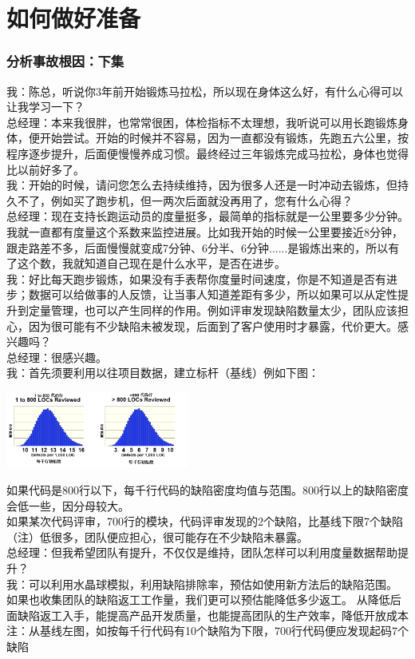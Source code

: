 \chapter{如何做好准备} %

\hypertarget{ux5206ux6790ux4e8bux6545ux6839ux56e0ux4e0bux96c6}{%
\subsection{分析事故根因：下集}\label{ux5206ux6790ux4e8bux6545ux6839ux56e0ux4e0bux96c6}}

我：陈总，听说你3年前开始锻炼马拉松，所以现在身体这么好，有什么心得可以让我学习一下？\\
总经理：本来我很胖，也常常很困，体检指标不太理想，我听说可以用长跑锻炼身体，便开始尝试。开始的时候并不容易，因为一直都没有锻炼，先跑五六公里，按程序逐步提升，后面便慢慢养成习惯。最终经过三年锻炼完成马拉松，身体也觉得比以前好多了。\\
我：开始的时候，请问您怎么去持续维持，因为很多人还是一时冲动去锻炼，但持久不了，例如买了跑步机，但一两次后面就没再用了，您有什么心得？\\
总经理：现在支持长跑运动员的度量挺多，最简单的指标就是一公里要多少分钟。我就一直都有度量这个系数来监控进展。比如我开始的时候一公里要接近8分钟，跟走路差不多，后面慢慢就变成7分钟、6分半、6分钟......是锻炼出来的，所以有了这个数，我就知道自己现在是什么水平，是否在进步。\\
我：好比每天跑步锻炼，如果没有手表帮你度量时间速度，你是不知道是否有进步；数据可以给做事的人反馈，让当事人知道差距有多少，所以如果可以从定性提升到定量管理，也可以产生同样的作用。例如评审发现缺陷数量太少，团队应该担心，因为很可能有不少缺陷未被发现，后面到了客户使用时才暴露，代价更大。感兴趣吗？\\
总经理：很感兴趣。\\
我：首先须要利用以往项目数据，建立标杆（基线）例如下图：


\includegraphics[width=6cm]{微信截图_20230605130227.png}

如果代码是800行以下，每千行代码的缺陷密度均值与范围。800行以上的缺陷密度会低一些，因分母较大。\\
如果某次代码评审，700行的模块，代码评审发现的2个缺陷，比基线下限7个缺陷（注）低很多，团队便应担心，很可能存在不少缺陷未暴露。\\
总经理：但我希望团队有提升，不仅仅是维持，团队怎样可以利用度量数据帮助提升？\\
我：可以利用水晶球模拟，利用缺陷排除率，预估如使用新方法后的缺陷范围。\\
如果也收集团队的缺陷返工工作量，我们更可以预估能降低多少返工。
从降低后面缺陷返工入手，能提高产品开发质量，也能提高团队的生产效率，降低开放成本\\
注：从基线左图，如按每千行代码有10个缺陷为下限，700行代码便应发现起码7个缺陷

